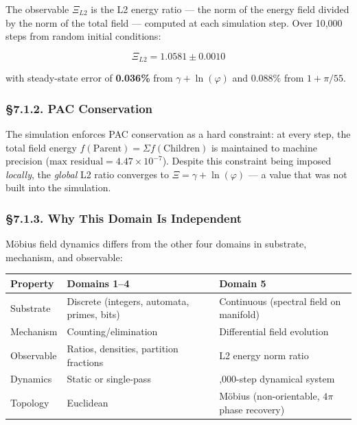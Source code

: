 \documentclass[
  11pt,
  a4paper]{article}
\begin{document}
The observable \(\Xi_{L2}\) is the L2 energy ratio --- the norm of the
energy field divided by the norm of the total field --- computed at each
simulation step. Over 10,000 steps from random initial conditions:

\[\Xi_{L2} = 1.0581 \pm 0.0010\]

with steady-state error of \textbf{0.036\%} from
\(\gamma + \ln(\varphi)\) and 0.088\% from \(1 + \pi/55\).

\subsubsection{§7.1.2. PAC Conservation}\label{pac-conservation}

The simulation enforces PAC conservation as a hard constraint: at every
step, the total field energy
\(f(\text{Parent}) = \Sigma f(\text{Children})\) is maintained to
machine precision (\(\text{max residual} = 4.47 \times 10^{-7}\)).
Despite this constraint being imposed \emph{locally}, the \emph{global}
L2 ratio converges to \(\Xi = \gamma + \ln(\varphi)\) --- a value that
was not built into the simulation.

\subsubsection{§7.1.3. Why This Domain Is
Independent}\label{why-this-domain-is-independent}

Möbius field dynamics differs from the other four domains in substrate,
mechanism, and observable:

\begin{longtable}[]{@{}
  >{\raggedright\arraybackslash}p{}
  >{\raggedright\arraybackslash}p{}
  >{\raggedright\arraybackslash}p{}@{}}
\toprule\noalign{}
\begin{minipage}[b]{\linewidth}\raggedright
Property
\end{minipage} & \begin{minipage}[b]{\linewidth}\raggedright
Domains 1--4
\end{minipage} & \begin{minipage}[b]{\linewidth}\raggedright
Domain 5
\end{minipage} \\
\midrule\noalign{}
\endhead
\bottomrule\noalign{}
\endlastfoot
Substrate & Discrete (integers, automata, primes, bits) & Continuous
(spectral field on manifold) \\
Mechanism & Counting/elimination & Differential field evolution \\
Observable & Ratios, densities, partition fractions & L2 energy norm
ratio \\
Dynamics & Static or single-pass & 10,000-step dynamical system \\
Topology & Euclidean & Möbius (non-orientable, \(4\pi\) phase
recovery) \\
\end{longtable}
\end{document}
